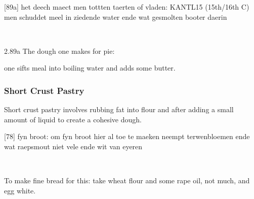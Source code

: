 \documentclass[a4paper]{article}
\begin{document}
\medskip
\begin{minipage}{.45\textwidth}
[89a] het deech maect men tottten taerten of vladen: KANTL15 (15th/16th C)
men schuddet meel in ziedende water ende wat gesmolten booter daerin	
\end{minipage}
\begin{minipage}{0.05\textwidth}
\ \ \ 
\end{minipage}
\begin{minipage}{.45\textwidth}
2.89a The dough one makes for pie: 

one sifts meal into boiling water and adds some butter.
\end{minipage}

\subsubsection{Short Crust Pastry}
Short crust pastry involves rubbing fat into flour and after adding a small amount of liquid to create a cohesive dough.


\medskip
\begin{minipage}{.45\textwidth}
[78] fyn broot: 
om fyn broot hier al toe te maeken neempt terwenbloemen ende wat raepsmout niet vele ende wit van eyeren \cite{KANTL15}
\end{minipage}
\begin{minipage}{0.05\textwidth}
\ \ \ 
\end{minipage}
\begin{minipage}{.45\textwidth}
	To make fine bread for this: take wheat flour and some rape oil, not much, and egg white. \cite{KANTL15}
\end{minipage}
\end{document}
